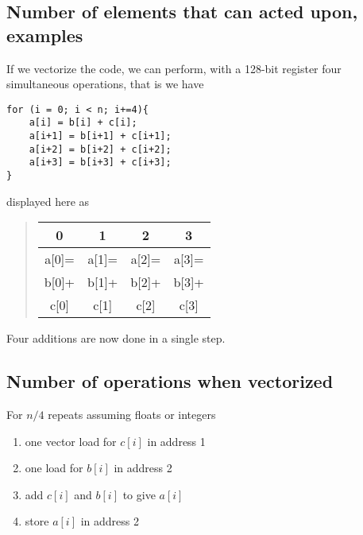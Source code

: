 \noindent
\subsection*{Number of elements that can acted upon, examples}
If we vectorize the code, we can perform, with a 128-bit register four simultaneous operations, that is
we have







\begin{verbatim}
for (i = 0; i < n; i+=4){
    a[i] = b[i] + c[i];
    a[i+1] = b[i+1] + c[i+1];
    a[i+2] = b[i+2] + c[i+2];
    a[i+3] = b[i+3] + c[i+3];
}

\end{verbatim}

displayed here as


\begin{quote}
\begin{tabular}{cccc}
\hline
\multicolumn{1}{c}{ 0 } & \multicolumn{1}{c}{ 1 } & \multicolumn{1}{c}{ 2 } & \multicolumn{1}{c}{ 3 } \\
\hline
a[0]= & a[1]= & a[2]= & a[3]= \\
\hline
b[0]+ & b[1]+ & b[2]+ & b[3]+ \\
\hline
c[0]  & c[1]  & c[2]  & c[3]  \\
\hline
\end{tabular}
\end{quote}

\noindent
Four additions are now done in a single step.

\subsection*{Number of operations when vectorized}
For $n/4$ repeats assuming floats or integers
\begin{enumerate}
\item one vector load for $c[i]$ in address 1

\item one load for $b[i]$ in address 2

\item add $c[i]$ and $b[i]$ to give $a[i]$

\item store $a[i]$ in address 2
\end{enumerate}

